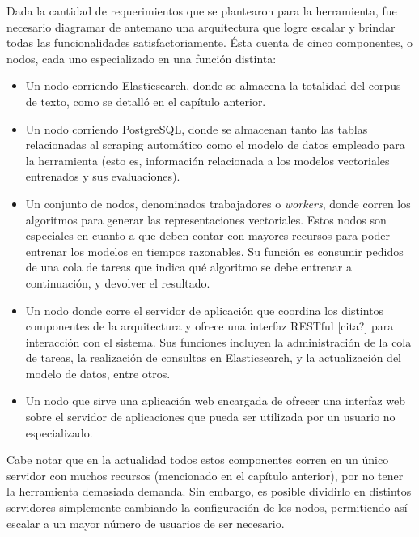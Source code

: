 Dada la cantidad de requerimientos que se plantearon para la herramienta, fue necesario diagramar de
antemano una arquitectura que logre escalar y brindar todas las funcionalidades
satisfactoriamente. Ésta cuenta de cinco componentes, o nodos, cada uno especializado en una función
distinta:

\begin{itemize}

\item Un nodo corriendo Elasticsearch, donde se almacena la totalidad del corpus de texto, como se
detalló en el capítulo anterior.

\item Un nodo corriendo PostgreSQL, donde se almacenan tanto las tablas relacionadas al scraping
automático como el modelo de datos empleado para la herramienta (esto es, información relacionada a
los modelos vectoriales entrenados y sus evaluaciones).

\item Un conjunto de nodos, denominados trabajadores o \textit{workers}, donde corren los algoritmos
para generar las representaciones vectoriales. Estos nodos son especiales en cuanto a que deben
contar con mayores recursos para poder entrenar los modelos en tiempos razonables. Su función es
consumir pedidos de una cola de tareas que indica qué algoritmo se debe entrenar a continuación, y
devolver el resultado.

\item Un nodo donde corre el servidor de aplicación que coordina los distintos componentes de la
arquitectura y ofrece una interfaz RESTful [cita?] para interacción con el sistema. Sus funciones
incluyen la administración de la cola de tareas, la realización de consultas en Elasticsearch, y la
actualización del modelo de datos, entre otros.

\item Un nodo que sirve una aplicación web encargada de ofrecer una interfaz web sobre el servidor
de aplicaciones que pueda ser utilizada por un usuario no especializado.

\end{itemize}

Cabe notar que en la actualidad todos estos componentes corren en un único servidor con muchos
recursos (mencionado en el capítulo anterior), por no tener la herramienta demasiada demanda. Sin
embargo, es posible dividirlo en distintos servidores simplemente cambiando la configuración de los
nodos, permitiendo así escalar a un mayor número de usuarios de ser necesario.

